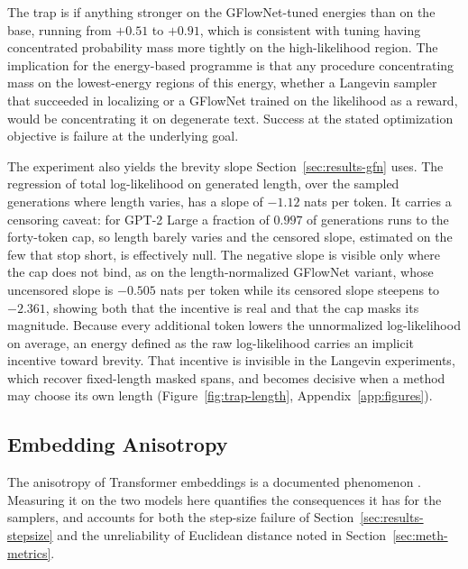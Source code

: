 The trap is if anything stronger on the GFlowNet-tuned energies than on the base, running from $+0.51$ to $+0.91$, which is consistent with tuning having concentrated probability mass more tightly on the high-likelihood region. The implication for the energy-based programme is that any procedure concentrating mass on the lowest-energy regions of this energy, whether a Langevin sampler that succeeded in localizing or a GFlowNet trained on the likelihood as a reward, would be concentrating it on degenerate text. Success at the stated optimization objective is failure at the underlying goal.

The experiment also yields the brevity slope Section~\ref{sec:results-gfn} uses. The regression of total log-likelihood on generated length, over the sampled generations where length varies, has a slope of $-1.12$ nats per token.
It carries a censoring caveat: for GPT-2 Large a fraction of $0.997$ of generations runs to the forty-token cap, so length barely varies and the censored slope, estimated on the few that stop short, is effectively null. The negative slope is visible only where the cap does not bind, as on the length-normalized GFlowNet variant, whose uncensored slope is $-0.505$ nats per token while its censored slope steepens to $-2.361$, showing both that the incentive is real and that the cap masks its magnitude.
Because every additional token lowers the unnormalized log-likelihood on average, an energy defined as the raw log-likelihood carries an implicit incentive toward brevity. That incentive is invisible in the Langevin experiments, which recover fixed-length masked spans, and becomes decisive when a method may choose its own length (Figure~\ref{fig:trap-length}, Appendix~\ref{app:figures}).

\subsection{Embedding Anisotropy}
\label{sec:results-aniso}

The anisotropy of Transformer embeddings is a documented phenomenon \citep{gao2019representation, ethayarajh2019contextual}. Measuring it on the two models here quantifies the consequences it has for the samplers, and accounts for both the step-size failure of Section~\ref{sec:results-stepsize} and the unreliability of Euclidean distance noted in Section~\ref{sec:meth-metrics}.

